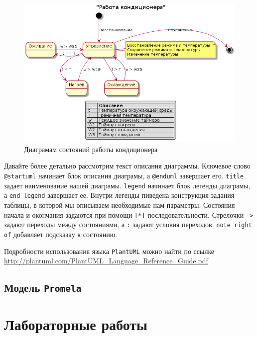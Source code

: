 \documentclass[12pt, twoside]{report}
\begin{document}
\begin{figure}
  \includegraphics[width=\textwidth]{cond_sample}
  \centering
    \caption{Диаграмам состояний работы кондиционера}
  \label{fig:cond_diagram}
\end{figure}

Давайте более детально рассмотрим текст описания диаграммы.
Ключевое слово \texttt{@startuml} начинает блок описания диаграмы, а \texttt{@enduml} завершает его. \texttt{title} задает наименование нашей диаграмы. 
\texttt{legend} начинает блок легенды диаграмы, а \texttt{end legend} завершает ее. Внутри легенды пиведена конструкция задания таблицы, в которой мы описываем 
необходимые нам параметры. Состояния начала и окончания задаются при помощи \texttt{[*]} последовательности. Стрелочки \texttt{-->} задают переходы 
между состояниями, а \texttt{:} задают условия переходов. \texttt{note right of} добавляет подсказку к состоянию.

Подробности использования языка \texttt{PlantUML} можно найти по ссылке \url{http://plantuml.com/PlantUML_Language_Reference_Guide.pdf}

\newpage
\section*{Модель \texttt{Promela}}\label{practical_work_2}

\newpage
\chapter*{Лабораторные работы}\label{labs_works}
\end{document}

